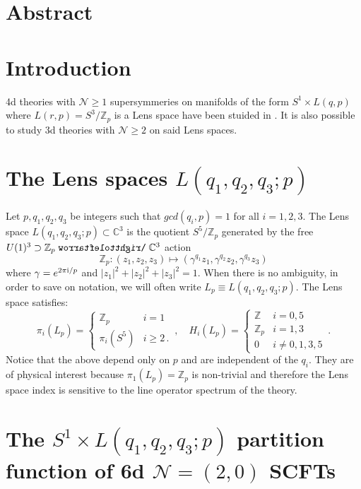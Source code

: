 \documentclass[main.tex]{subfiles}
\begin{document}
 
\section*{Abstract}
\section{Introduction}
4d theories with $\mathcal{N}\geq1$ supersymmeries on manifolds of the form $S^1\times L(q,p)$ where $L(r,p)=S^3/\mathbb{Z}_p$ is a Lens space have been stuided in \cite{Benini:2011nc,Alday:2013rs,Razamat:2013jxa,Fluder:2017oxm,Nishioka:2014zpa,Razamat:2013opa}. It is also possible to study 3d theories with $\mathcal{N}\geq2$ on said Lens spaces. 
\section{The Lens spaces $L(q_1,q_2,q_3;p)$}
Let $p,q_1,q_2,q_3$ be integers such that $gcd(q_i,p)=1$ for all $i=1,2,3$. The Lens space $L(q_1,q_2,q_3;p)\subset\mathbb{C}^3$ is the quotient $S^5/\mathbb{Z}_p$ generated by the free $U(1)^3\supset\mathbb{Z}_p\acts\mathbb{C}^3$ action
\begin{equation}\label{eqn:Lensaction}
\mathbb{Z}_p:(z_1,z_2,z_3)\mapsto\left(\gamma^{q_1}z_1,\gamma^{q_2}z_2,\gamma^{q_3}z_3\right)
\end{equation}
where $\gamma=e^{2\pi\mathrm{i}/p}$ and $|z_1|^2+|z_2|^2+|z_3|^2=1$. When there is no ambiguity, in order to save on notation, we will often write $L_p\equiv L(q_1,q_2,q_3;p)$. The Lens space satisfies:
\begin{equation}
\pi_i\left(L_p\right)=\begin{cases}
\mathbb{Z}_p & i=1\\
\pi_{i}\left(S^5\right)&i\geq2\,.
\end{cases}\,,
\quad H_i\left(L_p\right)=\begin{cases}
\mathbb{Z} & i=0,5\\
\mathbb{Z}_p&i=1,3\\
0&i\neq0,1,3,5
\end{cases}\,.
\end{equation}
Notice that the above depend only on $p$ and are independent of the $q_i$. They are of physical interest because $\pi_1(L_p)=\mathbb{Z}_p$ is non-trivial and therefore the Lens space index is sensitive to the line operator spectrum of the theory.

\section{The $S^1\times L(q_1,q_2,q_3;p)$ partition function of 6d $\mathcal{N}=(2,0)$ SCFTs}
\label{Sec:Lensspace}
\end{document}
